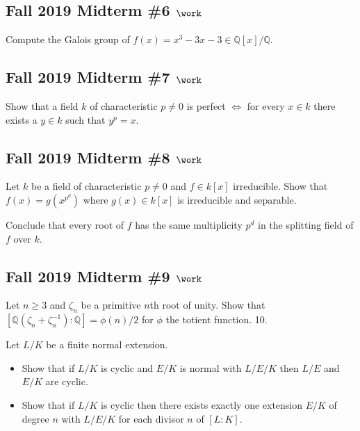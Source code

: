 \hypertarget{fall-2019-midterm-6-work}{%
\subsection{\texorpdfstring{Fall 2019 Midterm \#6
\(\work\)}{Fall 2019 Midterm \#6 \textbackslash work}}\label{fall-2019-midterm-6-work}}

Compute the Galois group of
\(f(x) = x^3-3x -3\in {\mathbb{Q}}[x]/{\mathbb{Q}}\).

\hypertarget{fall-2019-midterm-7-work}{%
\subsection{\texorpdfstring{Fall 2019 Midterm \#7
\(\work\)}{Fall 2019 Midterm \#7 \textbackslash work}}\label{fall-2019-midterm-7-work}}

Show that a field \(k\) of characteristic \(p\neq 0\) is perfect
\(\iff\) for every \(x\in k\) there exists a \(y\in k\) such that
\(y^p=x\).

\hypertarget{fall-2019-midterm-8-work}{%
\subsection{\texorpdfstring{Fall 2019 Midterm \#8
\(\work\)}{Fall 2019 Midterm \#8 \textbackslash work}}\label{fall-2019-midterm-8-work}}

Let \(k\) be a field of characteristic \(p\neq 0\) and \(f\in k[x]\)
irreducible. Show that \(f(x) = g(x^{p^d})\) where \(g(x) \in k[x]\) is
irreducible and separable.

Conclude that every root of \(f\) has the same multiplicity \(p^d\) in
the splitting field of \(f\) over \(k\).

\hypertarget{fall-2019-midterm-9-work}{%
\subsection{\texorpdfstring{Fall 2019 Midterm \#9
\(\work\)}{Fall 2019 Midterm \#9 \textbackslash work}}\label{fall-2019-midterm-9-work}}

Let \(n\geq 3\) and \(\zeta_n\) be a primitive \(n\)th root of unity.
Show that
\([{\mathbb{Q}}(\zeta_n + \zeta_n^{-1}): {\mathbb{Q}}] = \phi(n)/2\) for
\(\phi\) the totient function. 10.

Let \(L/K\) be a finite normal extension.

\begin{itemize}
\item
  Show that if \(L/K\) is cyclic and \(E/K\) is normal with \(L/E/K\)
  then \(L/E\) and \(E/K\) are cyclic.
\item
  Show that if \(L/K\) is cyclic then there exists exactly one extension
  \(E/K\) of degree \(n\) with \(L/E/K\) for each divisor \(n\) of
  \([L:K]\).
\end{itemize}

